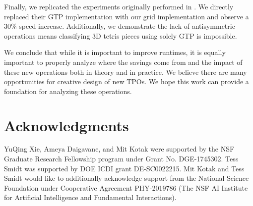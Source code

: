 \documentclass{article}
\theoremstyle{definition}
\theoremstyle{remark}
\begin{document}
Finally, we replicated the experiments originally performed in \citet{gaunt}. We directly replaced their GTP implementation with our grid implementation and observe a 30\% speed increase. Additionally, we demonstrate the lack of antisymmetric operations means classifying 3D tetris pieces using solely GTP is impossible.

We conclude that while it is important to improve runtimes, it is equally important to properly analyze where the savings come from and the impact of these new operations both in theory and in practice. We believe there are many opportunities for creative design of new TPOs. We hope this work can provide a foundation for analyzing these operations.



\section*{Acknowledgments}

YuQing Xie, Ameya Daigavane, and Mit Kotak were supported by the NSF Graduate Research Fellowship program under Grant No. DGE-1745302. Tess Smidt was supported by DOE ICDI grant DE-SC0022215. Mit Kotak and Tess Smidt would like to additionally acknowledge support from the National Science Foundation under Cooperative Agreement PHY-2019786 (The NSF AI Institute for Artificial Intelligence and Fundamental Interactions).
\end{document}
